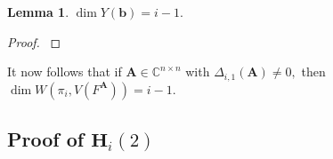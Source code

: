 \documentclass[a4paper]{article}
\def\A{\mathfrak{A}}
\def\mA{{\bm A}}
\def\C{\mathbb{C}}
\newtheorem{lemma}[theorem]{Lemma}
\begin{document}
    \begin{lemma}
    $\dim Y(\bm b) = i-1.$
    \end{lemma}
    \begin{proof}
    \cite[Lemma B.5, Lemma B.11]{TWT}
    \end{proof}
    \noindent
    It now follows that if $\bm A \in \C^{n \times n}$ with $\Delta_{i,1}(\bm A)\not = 0,$ then $\dim W(\pi_i,V(F^{\mA})) = i-1.$
%






\subsection{Proof of $\textbf{H}_i(2)$}
\end{document}

